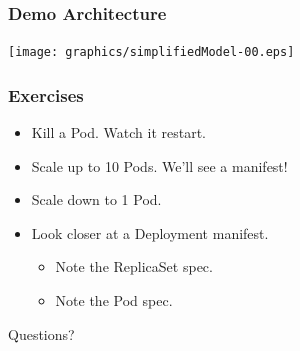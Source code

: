     \begin{frame}
        \frametitle{Demo Architecture}
        \texttt{[image: graphics/simplifiedModel-00.eps]}
    \end{frame}

    \begin{frame}
        \frametitle{Exercises}
        \begin{itemize}
            \item{Kill a Pod. Watch it restart.}
            \item{Scale up to 10 Pods. We'll see a manifest!}
            \item{Scale down to 1 Pod.}
            \item{Look closer at a Deployment manifest.}
            \begin{itemize}
                \item{Note the ReplicaSet spec.}
                \item{Note the Pod spec.}
            \end{itemize}
        \end{itemize}
    \end{frame}

    \begin{frame}
        \begin{center}
            \Huge Questions?
        \end{center}
    \end{frame}

